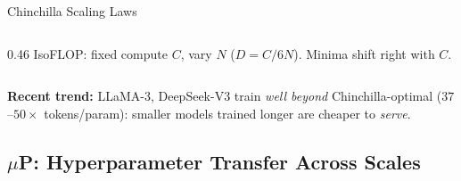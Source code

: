 \begin{frame}{Chinchilla Scaling Laws~\cite{hoffmann2022chinchilla}}
\begin{columns}[T]
\begin{column}{0.46\textwidth}
      {\small IsoFLOP: fixed compute $C$, vary $N$ ($D=C/6N$). Minima shift right with $C$.}
    \end{column}
  \end{columns}

  \vspace{0.2em}
  \textbf{Recent trend:} LLaMA-3, DeepSeek-V3 train \emph{well beyond} Chinchilla-optimal ($37$--$50\times$ tokens/param): smaller models trained longer are cheaper to \emph{serve}.
\end{frame}

\subsection{$\mu$P: Hyperparameter Transfer Across Scales}

